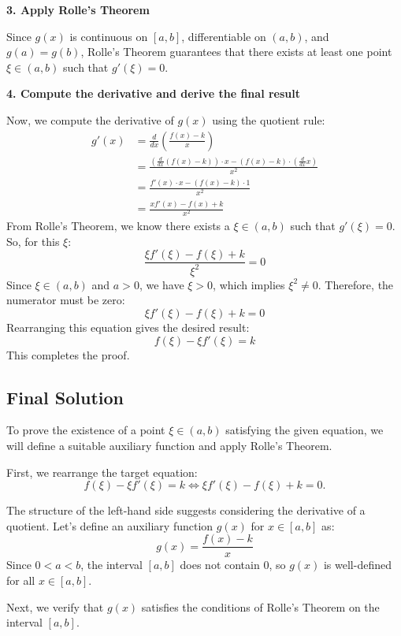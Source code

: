 \documentclass[12pt,a4paper]{article}
\theoremstyle{definition}
\begin{document}
        \textbf{3. Apply Rolle's Theorem}

        Since $g(x)$ is continuous on $[a,b]$, differentiable on $(a,b)$, and $g(a) = g(b)$, Rolle's Theorem guarantees that there exists at least one point $\xi \in (a,b)$ such that $g'(\xi) = 0$.

        \textbf{4. Compute the derivative and derive the final result}

        Now, we compute the derivative of $g(x)$ using the quotient rule:
        \begin{align*}
            g'(x) &= \frac{d}{dx} \left( \frac{f(x) - k}{x} \right) \\
            &= \frac{\left(\frac{d}{dx}(f(x)-k)\right) \cdot x - (f(x)-k) \cdot \left(\frac{d}{dx}x\right)}{x^2} \\
            &= \frac{f'(x) \cdot x - (f(x)-k) \cdot 1}{x^2} \\
            &= \frac{x f'(x) - f(x) + k}{x^2}
        \end{align*}
        From Rolle's Theorem, we know there exists a $\xi \in (a,b)$ such that $g'(\xi) = 0$. So, for this $\xi$:
        \[
            \frac{\xi f'(\xi) - f(\xi) + k}{\xi^2} = 0
        \]
        Since $\xi \in (a,b)$ and $a>0$, we have $\xi > 0$, which implies $\xi^2 \neq 0$. Therefore, the numerator must be zero:
        \[
            \xi f'(\xi) - f(\xi) + k = 0
        \]
        Rearranging this equation gives the desired result:
        \[
            f(\xi) - \xi f'(\xi) = k
        \]
        This completes the proof.

\subsection{Final Solution}
    To prove the existence of a point $\xi \in (a,b)$ satisfying the given equation, we will define a suitable auxiliary function and apply Rolle's Theorem.

    First, we rearrange the target equation:
    $$f(\xi) - \xi f'(\xi) = k \iff \xi f'(\xi) - f(\xi) + k = 0.$$

    The structure of the left-hand side suggests considering the derivative of a quotient. Let's define an auxiliary function $g(x)$ for $x \in [a,b]$ as:
    $$g(x) = \frac{f(x) - k}{x}$$
    Since $0 < a < b$, the interval $[a,b]$ does not contain $0$, so $g(x)$ is well-defined for all $x \in [a,b]$.

    Next, we verify that $g(x)$ satisfies the conditions of Rolle's Theorem on the interval $[a,b]$.
\end{document}
